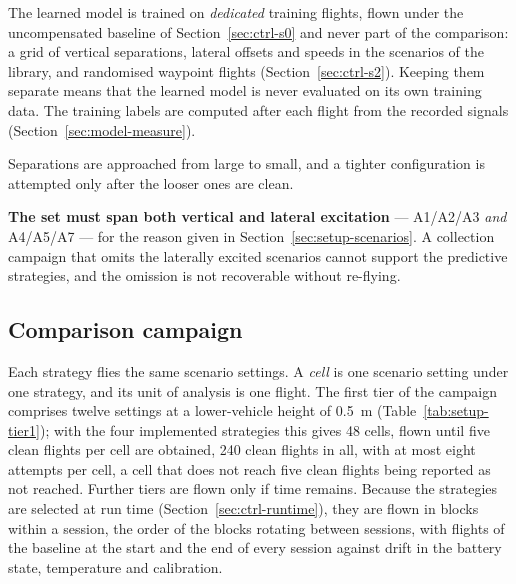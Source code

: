 The learned model is trained on \emph{dedicated} training flights, flown under the uncompensated
baseline of Section~\ref{sec:ctrl-s0} and never part of the comparison: a grid of vertical
separations, lateral offsets and speeds in the scenarios of the library, and randomised waypoint
flights (Section~\ref{sec:ctrl-s2}). Keeping them separate means that the learned model is never
evaluated on its own training data. The training labels are computed after each flight from the
recorded signals (Section~\ref{sec:model-measure}).

Separations are approached from large to small, and a tighter configuration is attempted only after
the looser ones are clean.

\textbf{The set must span both vertical and lateral excitation} --- A1/A2/A3 \emph{and} A4/A5/A7
--- for the reason given in Section~\ref{sec:setup-scenarios}. A collection campaign that omits the
laterally excited scenarios cannot support the predictive strategies, and the omission is not
recoverable without re-flying.

\subsection{Comparison campaign}
\label{sec:setup-campaign}

Each strategy flies the same scenario settings. A \emph{cell} is one scenario setting under one
strategy, and its unit of analysis is one flight. The first tier of the campaign comprises twelve
settings at a lower-vehicle height of \SI{0.5}{\metre} (Table~\ref{tab:setup-tier1}); with the four
implemented strategies this gives 48 cells, flown until five clean flights per cell are obtained,
240 clean flights in all, with at most eight attempts per cell, a cell that does not reach five
clean flights being reported as not reached. Further tiers are flown only if time remains.
Because the strategies are selected at run time (Section~\ref{sec:ctrl-runtime}), they are flown in
blocks within a session, the order of the blocks rotating between sessions, with flights of the
baseline at the start and the end of every session against drift in the battery state, temperature
and calibration.

